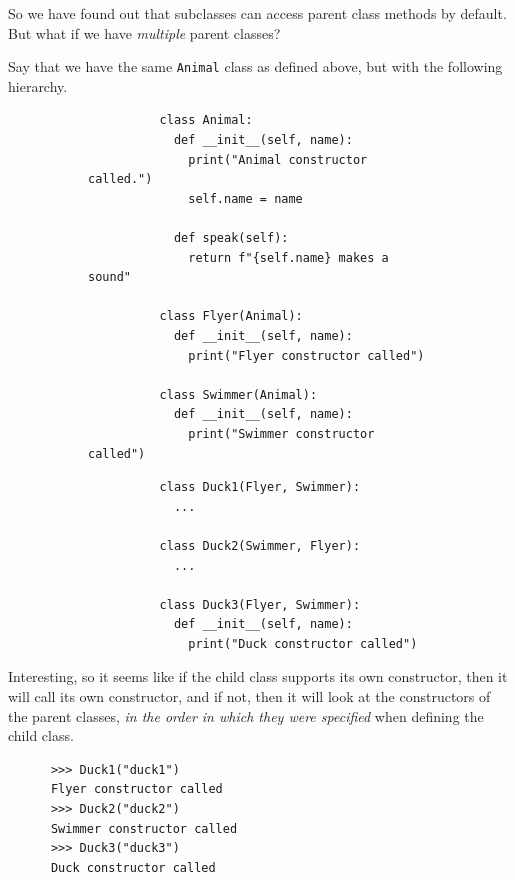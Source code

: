   So we have found out that subclasses can access parent class methods by default. But what if we have \textit{multiple} parent classes?  

  \begin{example}
    \label{ex:method-resolution-with-multiple-parent-classes}
    Say that we have the same \texttt{Animal} class as defined above, but with the following hierarchy. 

    \begin{figure}[H]
      \centering
      \begin{subfigure}[b]{0.48\textwidth}
        \centering
        \begin{lstlisting}
          class Animal: 
            def __init__(self, name):
              print("Animal constructor called.")
              self.name = name
            
            def speak(self):
              return f"{self.name} makes a sound"  

          class Flyer(Animal):  
            def __init__(self, name): 
              print("Flyer constructor called") 

          class Swimmer(Animal): 
            def __init__(self, name): 
              print("Swimmer constructor called") 
        \end{lstlisting}
        \caption{}
      \end{subfigure}
      \hfill 
      \begin{subfigure}[b]{0.48\textwidth}
        \centering
        \begin{lstlisting}
          class Duck1(Flyer, Swimmer): 
            ... 

          class Duck2(Swimmer, Flyer): 
            ...

          class Duck3(Flyer, Swimmer): 
            def __init__(self, name): 
              print("Duck constructor called")
        \end{lstlisting}
        \caption{}
      \end{subfigure}
      \caption{}
    \end{figure}

    Interesting, so it seems like if the child class supports its own constructor, then it will call its own constructor, and if not, then it will look at the constructors of the parent classes, \textit{in the order in which they were specified} when defining the child class. 
      
    \begin{lstlisting}
      >>> Duck1("duck1")
      Flyer constructor called
      >>> Duck2("duck2")
      Swimmer constructor called
      >>> Duck3("duck3")
      Duck constructor called
    \end{lstlisting} 
  \end{example} 

